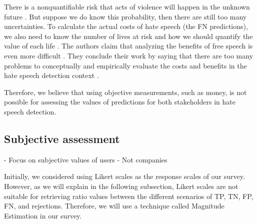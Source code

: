 %
There is a nonquantifiable risk that acts of violence will happen in the unknown future \citep{sunstein2018does}.
%
But suppose we do know this probability, then there are still too many uncertainties.
%
To calculate the actual costs of hate speech (the FN predictions), we also need to know the number of lives at risk and how we should quantify the value of each life \citep{sunstein2018does}.
%
The authors claim that analyzing the benefits of free speech is even more difficult \citep{sunstein2018does}.
%
They conclude their work by saying that there are too many problems to conceptually and empirically evaluate the costs and benefits in the hate speech detection context \citep{sunstein2018does}.
%

%
Therefore, we believe that using objective measurements, such as money, is not possible for assessing the values of predictions for both stakeholders in hate speech detection.
%

\subsection{Subjective assessment}
- Focus on subjective values of users
- Not companies

Initially, we considered using Likert scales as the response scales of our survey. However, as we will explain in the following subsection, Likert scales are not suitable for retrieving ratio values between the different scenarios of TP, TN, FP, FN, and rejections. Therefore, we will use a technique called Magnitude Estimation in our survey.

